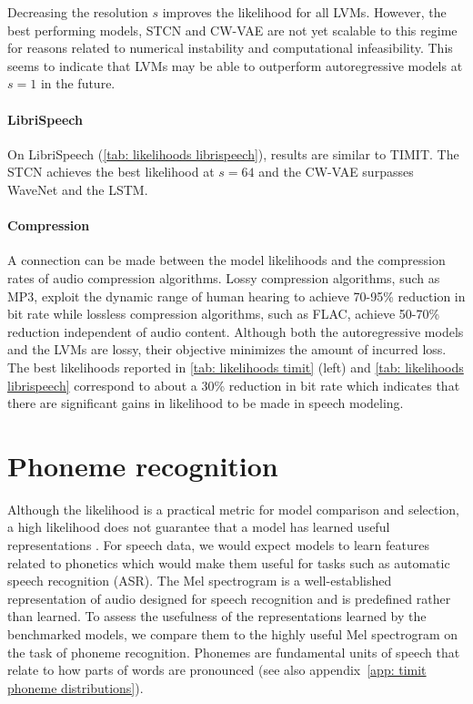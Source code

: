 {Decreasing the resolution $s$ improves the likelihood for all LVMs. However, the best performing models, STCN and CW-VAE are not yet scalable to this regime for reasons related to numerical instability and computational infeasibility. This seems to indicate that LVMs may be able to outperform autoregressive models at $s=1$ in the future.
\paragraph{LibriSpeech}
On LibriSpeech (\cref{tab: likelihoods librispeech}), results are similar to TIMIT. The STCN achieves the best likelihood at $s=64$ and the CW-VAE surpasses WaveNet and the LSTM. 
\paragraph{Compression}
A connection can be made between the model likelihoods and the compression rates of audio compression algorithms. 
Lossy compression algorithms, such as MP3, exploit the dynamic range of human hearing to achieve 70-95\% reduction in bit rate \parencite{brandenburg_mpeg-2_1998} while lossless compression algorithms, such as FLAC, achieve 50-70\% reduction \parencite{coalson_free_2019} independent of audio content. 
Although both the autoregressive models and the LVMs are lossy, their objective minimizes the amount of incurred loss. 
The best likelihoods reported in \cref{tab: likelihoods timit} (left) and \cref{tab: likelihoods librispeech} correspond to about a 30\% reduction in bit rate which indicates that there are significant gains in likelihood to be made in speech modeling.

\section{Phoneme recognition}\label{sec: phoneme recognition}
Although the likelihood is a practical metric for model comparison and selection, a high likelihood does not guarantee that a model has learned useful representations \parencite{huszar_is_2017}. 
For speech data, we would expect models to learn features related to phonetics which would make them useful for tasks such as automatic speech recognition (ASR). 
The Mel spectrogram is a well-established representation of audio designed for speech recognition and is predefined rather than learned. %
To assess the usefulness of the representations learned by the benchmarked models, we compare them to the highly useful Mel spectrogram on the task of phoneme recognition. 
Phonemes are fundamental units of speech that relate to how parts of words are pronounced (see also appendix~\cref{app: timit phoneme distributions}).

}

